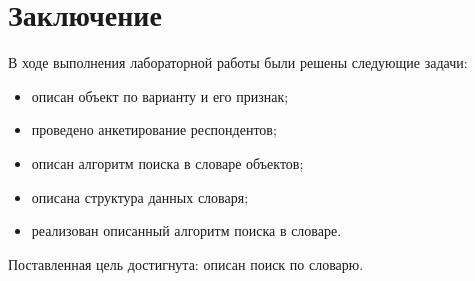\chapter*{Заключение}

В ходе выполнения лабораторной работы были решены следующие задачи:

\begin{itemize}
	
	\item описан объект по варианту и его признак;
	\item проведено анкетирование респондентов;
	\item описан алгоритм поиска в словаре объектов;
	\item описана структура данных словаря;
	\item реализован описанный алгоритм поиска в словаре.
\end{itemize}

Поставленная цель достигнута: описан поиск по словарю.
